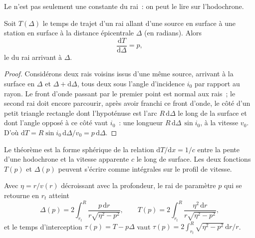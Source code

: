 \begin{omfigure}
\par{}
\label{fig:b3:seismology-imaging:shells}
\end{omfigure}

Le  n'est pas seulement une constante du rai~: on peut le lire
sur l'hodochrone.

\begin{theorem}\label{thm:b3:seismology-imaging:benndorf}
Soit $T(\Delta)$ le temps de trajet d'un rai allant d'une source en surface à une
station en surface à la distance épicentrale $\Delta$ (en radians). Alors
\[
  \frac{\mathrm dT}{\mathrm d\Delta} = p ,
\]
le  du rai arrivant à $\Delta$.
\end{theorem}

\begin{proof}
Considérons deux rais voisins issus d'une même source, arrivant à la surface
en $\Delta$ et $\Delta + \mathrm d\Delta$, tous deux sous l'angle d'incidence $i_0$
par rapport au rayon. Le front d'onde passant par le premier point est normal aux rais~;
le second rai doit encore parcourir, après avoir franchi ce front d'onde, le côté d'un
petit triangle rectangle dont l'hypoténuse est l'arc $R\,\mathrm d\Delta$ le long
de la surface et dont l'angle opposé à ce côté vaut $i_0$~: une longueur
$R\,\mathrm d\Delta\,\sin i_0$, à la vitesse $v_0$. D'où
$\mathrm dT = R\sin i_0\,\mathrm d\Delta/v_0 = p\,\mathrm d\Delta$.
\end{proof}

Le théorème est la forme sphérique de la relation $\mathrm dT/\mathrm dx = 1/c$
entre la pente d'une hodochrone et la vitesse apparente $c$ le long de
surface. Les deux fonctions $T(p)$ et $\Delta(p)$ peuvent s'écrire comme intégrales
sur le profil de vitesse.

\begin{proposition}\label{prop:b3:seismology-imaging:integrals}
Avec $\eta = r/v(r)$ décroissant avec la profondeur, le rai de paramètre $p$ qui se retourne
en $r_t$ atteint
\[
  \Delta(p) = 2\int_{r_t}^{R}\frac{p\,\mathrm dr}{r\sqrt{\eta^2 - p^2}},
  \qquad
  T(p) = 2\int_{r_t}^{R}\frac{\eta^2\,\mathrm dr}{r\sqrt{\eta^2 - p^2}},
\]
et le temps d'interception $\tau(p) = T - p\Delta$ vaut
$\tau(p) = 2\int_{r_t}^{R}\sqrt{\eta^2 - p^2}\,\mathrm dr/r$.
\end{proposition}

